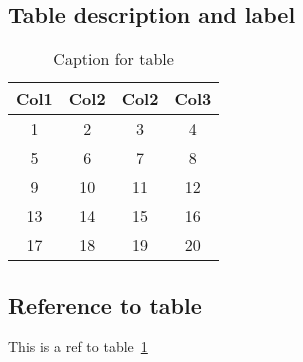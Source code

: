\subsection{Table description and label}

\begin{table}[H]
  \centering
  \begin{tabular}
    {|c |c |c |c|} 
    \hline
    Col1 & Col2 & Col2 & Col3 \\ [0.5ex] 
    \hline
    1 & 2 & 3 & 4 \\ 
    \hline
    5 & 6 & 7 & 8 \\
    \hline
    9 & 10 & 11 & 12 \\
    \hline
    13 & 14 & 15 & 16 \\
    \hline
    17 & 18 & 19 & 20 \\ [1ex] 
    \hline
  \end{tabular}
  \caption{\label{tab:table-name} Caption for table}
\end{table}


\subsection{Reference to table}
This is a ref to table~\ref{tab:table-name}